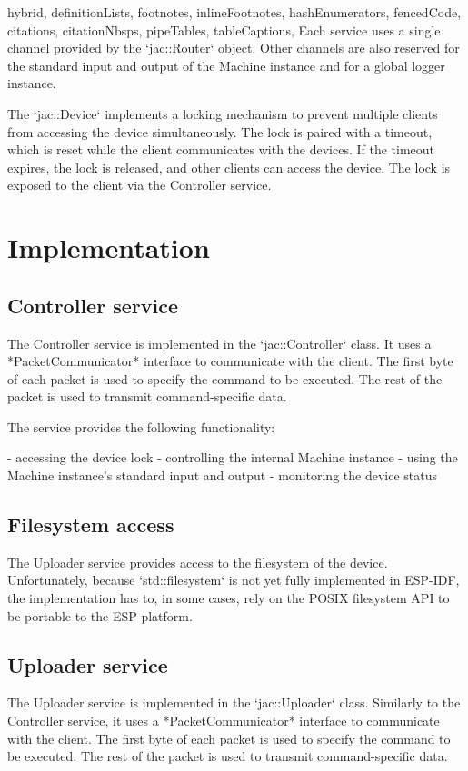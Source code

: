 \begin{markdown*}{%
  hybrid,
  definitionLists,
  footnotes,
  inlineFootnotes,
  hashEnumerators,
  fencedCode,
  citations,
  citationNbsps,
  pipeTables,
  tableCaptions,
}
Each service uses a single channel provided by the `jac::Router` object. Other channels are also reserved for the standard input and output of the Machine instance and for a global logger instance.

The `jac::Device` implements a locking mechanism to prevent multiple clients from accessing the device simultaneously. The lock is paired with a timeout, which is reset while the client communicates with the devices. If the timeout expires, the lock is released, and other clients can access the device. The lock is exposed to the client via the Controller service.


\section{Implementation}

\subsection{Controller service}

The Controller service is implemented in the `jac::Controller` class. It uses a *PacketCommunicator* interface to communicate with the client. The first byte of each packet is used to specify the command to be executed. The rest of the packet is used to transmit command-specific data.

The service provides the following functionality:

  - accessing the device lock
  - controlling the internal Machine instance
  - using the Machine instance's standard input and output
  - monitoring the device status

\subsection{Filesystem access}

The Uploader service provides access to the filesystem of the device. Unfortunately, because `std::filesystem` is not yet fully implemented in ESP-IDF, the implementation has to, in some cases, rely on the POSIX filesystem API to be portable to the ESP platform.

\subsection{Uploader service}

The Uploader service is implemented in the `jac::Uploader` class. Similarly to the Controller service, it uses a *PacketCommunicator* interface to communicate with the client. The first byte of each packet is used to specify the command to be executed. The rest of the packet is used to transmit command-specific data.


\end{markdown*}
